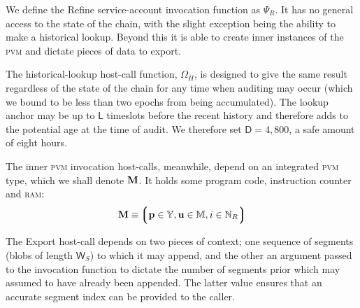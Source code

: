 We define the Refine service-account invocation function as $\Psi_R$. It has no general access to the state of the \Jam chain, with the slight exception being the ability to make a historical lookup. Beyond this it is able to create inner instances of the \textsc{pvm} and dictate pieces of data to export.

The historical-lookup host-call function, $\Omega_H$, is designed to give the same result regardless of the state of the chain for any time when auditing may occur (which we bound to be less than two epochs from being accumulated). The lookup anchor may be up to $\mathsf{L}$ timeslots before the recent history and therefore adds to the potential age at the time of audit. We therefore set $\mathsf{D} = 4,800$, a safe amount of eight hours.

The inner \textsc{pvm} invocation host-calls, meanwhile, depend on an integrated \textsc{pvm} type, which we shall denote $\mathbf{M}$. It holds some program code, instruction counter and \textsc{ram}:
\begin{equation}
  \pvm \equiv \tuple{\isa{\mathbf{p}}{\Y}, \isa{\mathbf{u}}{\ram}, \isa{i}{\N_R}}
\end{equation}

The Export host-call depends on two pieces of context; one sequence of segments (blobs of length $\mathsf{W}_S$) to which it may append, and the other an argument passed to the invocation function to dictate the number of segments prior which may assumed to have already been appended. The latter value ensures that an accurate segment index can be provided to the caller.


